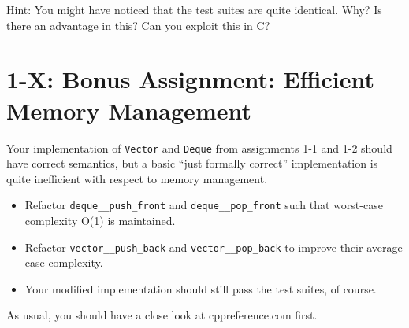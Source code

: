 \documentclass[]{article}
\providecommand{\tightlist}{%
  \setlength{\itemsep}{0pt}\setlength{\parskip}{0pt}}
\begin{document}
Hint: You might have noticed that the test suites are quite identical.
Why? Is there an advantage in this? Can you exploit this in C?

\section{1-X: Bonus Assignment: Efficient Memory
Management}\label{x-bonus-assignment-efficient-memory-management}

Your implementation of \texttt{Vector} and \texttt{Deque} from
assignments 1-1 and 1-2 should have correct semantics, but a basic
``just formally correct'' implementation is quite inefficient with
respect to memory management.

\begin{itemize}
\tightlist
\item
  Refactor \texttt{deque\_\_push\_front} and
  \texttt{deque\_\_pop\_front} such that worst-case complexity O(1) is
  maintained.
\item
  Refactor \texttt{vector\_\_push\_back} and
  \texttt{vector\_\_pop\_back} to improve their average case complexity.
\item
  Your modified implementation should still pass the test suites, of
  course.
\end{itemize}

As usual, you should have a close look at cppreference.com first.
\end{document}
